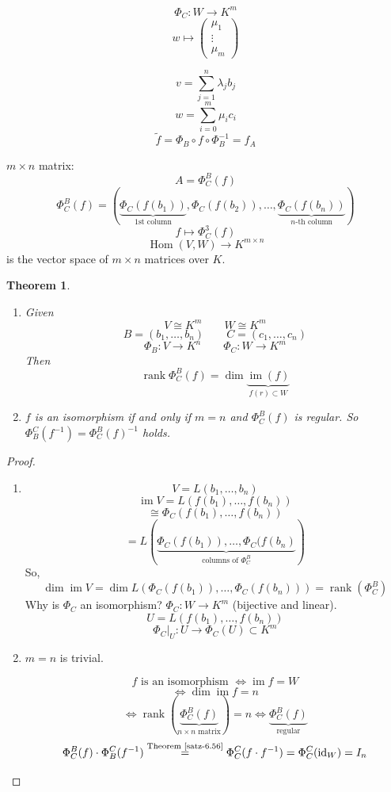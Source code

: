 \documentclass[a4paper,landscape,twocolumn]{article}
\newtheorem{theorem}{Theorem}[section]
\DeclareMathOperator\Hom{Hom} %
\DeclareMathOperator\image{im} %
\DeclareMathOperator\rank{rank} %
\begin{document}
\[ \Phi_C: W \to K^m \]
\[ w \mapsto \begin{pmatrix} \mu_1 \\ \vdots \\ \mu_m \end{pmatrix} \]

\[ v = \sum_{j=1}^n \lambda_j b_j \]
\[ w = \sum_{i=0}^m \mu_i c_i \]
\[ \tilde{f} = \Phi_B \circ f \circ \Phi_B^{-1} = f_A \]

$m\times n$ matrix:
\[ A = \Phi_C^B(f) \]
\[
  \Phi_C^B(f) = \left(
    \underbrace{\Phi_C(f(b_1))}_{\text{1st column}},
    \Phi_C(f(b_2)),
    \ldots,
    \underbrace{\Phi_C(f(b_n))}_{\text{$n$-th column}}
  \right)
\]
\[ f \mapsto \Phi_C^3(f) \]
\[ \Hom(V, W) \to K^{m\times n} \]
is the vector space of $m\times n$ matrices over $K$.

\begin{theorem}
  \label{satz-6.57}
  \begin{enumerate}
    \item
      Given
      \[ V \cong K^m \qquad W \cong K^m \]
      \[ B = (b_1, \ldots, b_n)  \qquad  C = (c_1, \ldots, c_n)  \]
      \[ \Phi_B:  V \to K^n \qquad \Phi_C: W \to K^m \]
      Then
      \[ \rank{\Phi_C^B(f)} = \dim{\underbrace{\image(f)}_{f(r) \subset W}} \]
    \item
      $f$ is an isomorphism if and only if $m = n$ and $\Phi_C^B(f)$ is regular.
      So $\Phi_B^C(f^{-1}) = \Phi_C^B(f)^{-1}$ holds.
  \end{enumerate}
\end{theorem}
\begin{proof}
  \begin{enumerate}
    \item
      \[ V = L(b_1, \ldots, b_n) \]
      \[ \image{V} = L(f(b_1), \ldots, f(b_n)) \]
      \[ \cong \Phi_C(f(b_1), \ldots, f(b_n)) \]
      \[ = L(\underbrace{\Phi_C(f(b_1)), \ldots, \Phi_C(f(b_n)}_{\text{columns of } \Phi_C^B}) \]
      So,
      \[ \dim{\image{V}} = \dim{L(\Phi_C(f(b_1)), \ldots, \Phi_C(f(b_n)))} = \rank(\Phi_C^B) \]
      Why is $\Phi_C$ an isomorphism? $\Phi_C: W \to K^m$ (bijective and linear).
      \[ U = L(f(b_1), \ldots, f(b_n)) \]
      \[ \left.\Phi_C\right|_U: U \to \Phi_C(U) \subset K^m \]
    \item
      $m = n$ is trivial.

      \[ f \text{ is an isomorphism } \iff \image{f} = W \]
      \[ \iff \dim{\image{f}} = n \]
      \[
        \iff
        \rank\left(\underbrace{\Phi_C^B(f)}_{n\times n \text{ matrix}}\right)
        = n \iff \underbrace{\Phi_C^B(f)}_{\text{regular}}
      \] \[
        \Phi_C^B(f) \cdot \Phi_B^C(f^{-1})
          \overset{\text{Theorem~\ref{satz-6.56}}}{=} \Phi_C^C(f \cdot f^{-1})
          = \Phi_C^C(\text{id}_W)
          = I_n
      \]
  \end{enumerate}
\end{proof}
\end{document}
